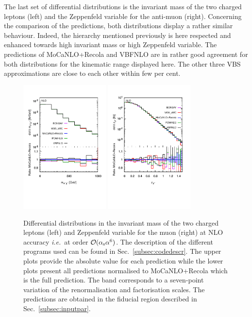 \documentclass[twocolumn,epjc3]{svjour3} %
\newlength{\width}
\begin{document}
    The last set of differential distributions is the invariant mass of the two charged leptons (left) and the Zeppenfeld variable for the anti-muon (right).
    Concerning the comparison of the predictions, both distributions display a rather similar behaviour.
    Indeed, the hierarchy mentioned previously is here respected and enhanced towards high invariant mass or high Zeppenfeld variable.
    The predictions of {\sc MoCaNLO}+{\sc Recola} and {\sc VBFNLO} are in rather good agreement for both distributions for the kinematic range displayed here.
    The other three VBS approximations are close to each other within few per cent.

     \begin{figure}
       \centering
       \includegraphics[width=0.4\textwidth,angle=0,clip=true,trim={0.4cm 2cm 0.cm 1.cm}]{figures/NLO/mll_NLO.pdf}
       \includegraphics[width=0.4\textwidth,angle=0,clip=true,trim={0.4cm 2cm 0.cm 1.cm}]{figures/NLO/zmu_NLO.pdf}
    \caption{\label{fig:distNLO3} Differential distributions in the invariant mass of the two charged leptons (left) and Zeppenfeld variable for the muon (right) at NLO accuracy \emph{i.e.}\ at order $\mathcal{O}(\alpha_{\rm s}\alpha^6)$.
    The description of the different programs used can be found in Sec.~\protect\ref{subsec:codedescr}.
    The upper plots provide the absolute value for each prediction while the lower plots present all predictions normalised to {\sc MoCaNLO}+{\sc Recola} which is the full prediction.
    The band corresponds to a seven-point variation of the renormalisation and factorisation scales.
    The predictions are obtained in the fiducial region described in Sec.~\protect\ref{subsec:inputpar}.
    }
    \end{figure}
\end{document}
